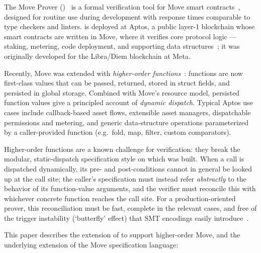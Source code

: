 \label{sec:intro}

The Move Prover (\MVP)~\cite{DillGPQXZ22} is a formal verification tool for Move smart contracts~\cite{blackshear2020resources,MoveOnAptosBook}, designed for routine use during development with response times comparable to type checkers and linters.
\MVP is deployed at Aptos, a public layer-1 blockchain whose smart contracts are written in Move, where it verifies core protocol logic --- staking, metering, code deployment, and supporting data structures~\cite{ParkZGXGCLC24, AptosFrameworkBook}; it was originally developed for the Libra/Diem blockchain at Meta.

Recently, Move was extended with \emph{higher-order functions}~\cite{grieskamp2025movehigherorder}: functions are now first-class values that can be passed, returned, stored in struct fields, and persisted in global storage.
Combined with Move's resource model, persisted function values give a principled account of \emph{dynamic dispatch}.
Typical Aptos use cases include callback-based asset flows, extensible asset managers, dispatchable permissions and metering, and generic data-structure operations parameterized by a caller-provided function (e.g.\ fold, map, filter, custom comparators).

Higher-order functions are a known challenge for verification: they break the modular, static-dispatch specification style on which \MVP was built.
When a call is dispatched dynamically, its pre- and post-conditions cannot in general be looked up at the call site; the caller's specification must instead refer \emph{abstractly} to the behavior of its function-value arguments, and the verifier must reconcile this with whichever concrete function reaches the call site.
For a production-oriented prover, this reconciliation must be fast, complete in the relevant cases, and free of the trigger instability (`butterfly' effect) that SMT encodings easily introduce~\cite{BUTTERFLY}.

This paper describes the extension of \MVP to support higher-order Move, and the underlying extension of the Move specification language:

